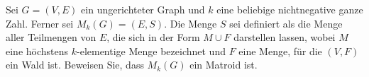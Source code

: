 
\begin{exercise}

Sei $G = (V, E)$ ein ungerichteter Graph und $k$ eine beliebige nichtnegative ganze Zahl. Ferner sei $M_k(G) = (E, S)$. Die Menge $S$ sei definiert als die Menge aller Teilmengen von $E$, die sich in der Form $M \cup F$ darstellen lassen, wobei $M$ eine höchstens $k$-elementige Menge bezeichnet und $F$ eine Menge, für die $(V, F)$ ein Wald ist. Beweisen Sie, dass $M_k(G)$ ein Matroid ist.

\end{exercise}


